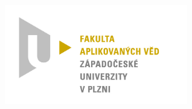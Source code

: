 \begin{titlepage}



    \includegraphics[width=80mm,scale=0.5]{imgs/logo.jpg}\\[1cm] %


    \vfill

\end{titlepage}
